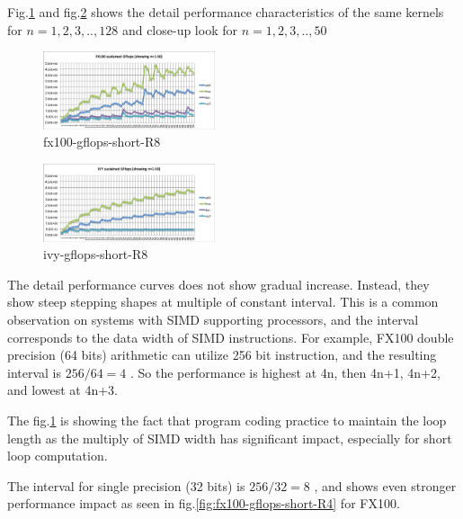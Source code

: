 \documentclass[conference]{IEEEtran}
\begin{document}
Fig.\ref{fig:fx100-gflops-short-R8} and fig.\ref{fig:ivy-gflops-short-R8}
shows the detail performance characteristics of the same kernels for
\begin{math}
n=1,2,3,..,128
\end{math}
and close-up look for
\begin{math}
n=1,2,3,..,50
\end{math}


\begin{figure}[tb]
\centering
\includegraphics[width=0.45\textwidth]{figs/fx100-gflops-short-R8.pdf}
\caption{fx100-gflops-short-R8}
\label{fig:fx100-gflops-short-R8}
\end{figure}

\begin{figure}[tb]
\centering
\includegraphics[width=0.45\textwidth]{figs/ivy-gflops-short-R8.pdf}
\caption{ivy-gflops-short-R8}
\label{fig:ivy-gflops-short-R8}
\end{figure}

The detail performance curves does not show gradual increase. Instead, they
show steep stepping shapes at multiple of constant interval.
This is a common observation on systems with SIMD supporting processors,
and the interval corresponds to the data width of SIMD instructions.
For example, FX100 double precision (64 bits) arithmetic can utilize
256 bit instruction, and the resulting interval is
\begin{math}
256 / 64 = 4
\end{math}
.
So the performance is highest at 4n, then 4n+1, 4n+2, and lowest at 4n+3.

The fig.\ref{fig:fx100-gflops-short-R8} is showing the fact that
program coding practice to maintain the loop length as the multiply of
SIMD width has significant impact, especially for short loop computation.

The interval for single precision (32 bits) is
\begin{math}
256 / 32 = 8
\end{math}
, and shows even stronger performance impact as seen in
fig.\ref{fig:fx100-gflops-short-R4} for FX100.
\end{document}
